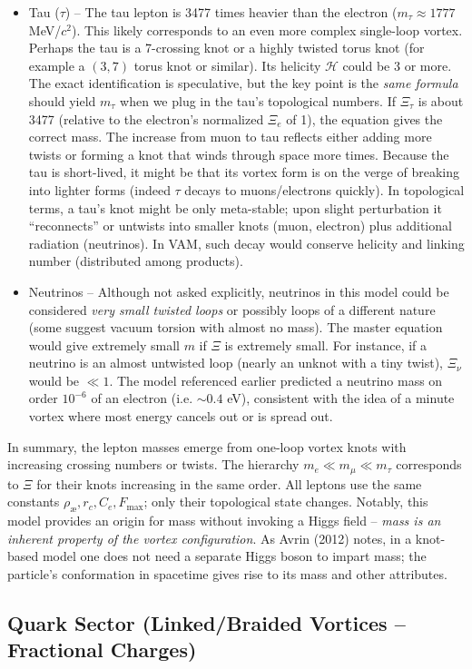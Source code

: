 \begin{itemize}
\item
Tau ($\tau$) – The tau lepton is 3477 times heavier than the electron ($m_\tau\approx1777$ MeV/$c^2$). This likely corresponds to an even more complex single-loop vortex. Perhaps the tau is a 7-crossing knot or a highly twisted torus knot (for example a $(3,7)$ torus knot or similar). Its helicity $\mathcal{H}$ could be 3 or more. The exact identification is speculative, but the key point is the \textit{same formula} should yield $m_\tau$ when we plug in the tau’s topological numbers. If $\Xi_\tau$ is about 3477 (relative to the electron’s normalized $\Xi_e$ of 1), the equation gives the correct mass. The increase from muon to tau reflects either adding more twists or forming a knot that winds through space more times. Because the tau is short-lived, it might be that its vortex form is on the verge of breaking into lighter forms (indeed $\tau$ decays to muons/electrons quickly). In topological terms, a tau’s knot might be only meta-stable; upon slight perturbation it “reconnects” or untwists into smaller knots (muon, electron) plus additional radiation (neutrinos). In VAM, such decay would conserve helicity and linking number (distributed among products).

\item
Neutrinos – Although not asked explicitly, neutrinos in this model could be considered \textit{very small twisted loops} or possibly loops of a different nature (some suggest vacuum torsion with almost no mass). The master equation would give extremely small $m$ if $\Xi$ is extremely small. For instance, if a neutrino is an almost untwisted loop (nearly an unknot with a tiny twist), $\Xi_{\nu}$ would be $\ll 1$. The model referenced earlier predicted a neutrino mass on order $10^{-6}$ of an electron (i.e. $\sim 0.4$ eV), consistent with the idea of a minute vortex where most energy cancels out or is spread out.

\end{itemize}

In summary, the lepton masses emerge from one-loop vortex knots with increasing crossing numbers or twists. The hierarchy $m_e \ll m_\mu \ll m_\tau$ corresponds to $\Xi$ for their knots increasing in the same order. All leptons use the same constants $\rho_{\text{\ae}},r_c,C_e,F_{\max}$; only their topological state changes. Notably, this model provides an origin for mass without invoking a Higgs field – \textit{mass is an inherent property of the vortex configuration}. As Avrin (2012) notes, in a knot-based model one does not need a separate Higgs boson to impart mass; the particle’s conformation in spacetime gives rise to its mass and other attributes.\subsection*{Quark Sector (Linked/Braided Vortices – Fractional Charges)}

